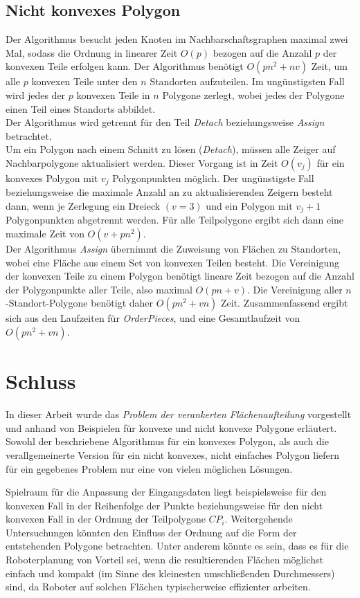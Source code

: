 \documentclass[ngerman]{seminarbeitrag}
\begin{document}
\subsection{Nicht konvexes Polygon}
Der Algorithmus \ord besucht jeden Knoten im Nachbarschaftsgraphen maximal zwei Mal, sodass die Ordnung in linearer Zeit $O(p)$ bezogen auf die Anzahl $p$ der konvexen Teile erfolgen kann.
Der Algorithmus \noncon benötigt $O(pn^{2} + nv)$ Zeit, um alle $p$ konvexen Teile unter den $n$ Standorten aufzuteilen. Im ungünstigsten Fall wird jedes der $p$ konvexen Teile in $n$ Polygone zerlegt, wobei jedes der Polygone einen Teil eines Standorts abbildet.\\
Der Algorithmus \daa wird getrennt für den Teil \emph{Detach} beziehungsweise \emph{Assign} betrachtet.\\
Um ein Polygon nach einem Schnitt zu lösen (\emph{Detach}), müssen alle Zeiger auf Nachbarpolygone aktualisiert werden. Dieser Vorgang ist in Zeit $O(v_{j})$ für ein konvexes Polygon mit $v_{j}$ Polygonpunkten möglich. Der ungünstigste Fall beziehungsweise die maximale Anzahl an zu aktualisierenden Zeigern besteht dann, wenn je Zerlegung ein Dreieck $(v=3)$ und ein Polygon mit $v_{j}+1$ Polygonpunkten abgetrennt werden. Für alle Teilpolygone ergibt sich dann eine maximale Zeit von $O(v + pn^{2})$.\\
Der Algorithmus \emph{Assign} übernimmt die Zuweisung von Flächen zu Standorten, wobei eine Fläche aus einem Set von konvexen Teilen besteht. Die Vereinigung der konvexen Teile zu einem Polygon benötigt lineare Zeit bezogen auf die Anzahl der Polygonpunkte aller Teile, also maximal $O(pn + v)$. Die Vereinigung aller $n$-Standort-Polygone benötigt daher $O(pn^{2}+ vn)$ Zeit. 
Zusammenfassend ergibt sich aus den Laufzeiten für \mbox{\textit{OrderPieces}}, \noncon und \daa eine Gesamtlaufzeit von $O(pn^{2} + vn)$.

\section{Schluss}\label{schluss}
In dieser Arbeit wurde das \emph{Problem der verankerten Flächenaufteilung} vorgestellt und anhand von Beispielen für konvexe und nicht konvexe Polygone erläutert.
Sowohl der beschriebene Algorithmus für ein konvexes Polygon, als auch die verallgemeinerte Version für ein nicht konvexes, nicht einfaches Polygon liefern für ein gegebenes Problem nur eine von vielen möglichen Lösungen.

Spielraum für die Anpassung der Eingangsdaten liegt beispielsweise für den konvexen Fall in der Reihenfolge der Punkte beziehungsweise für den nicht konvexen Fall in der Ordnung der Teilpolygone $CP_{i}$. Weitergehende Untersuchungen könnten den Einfluss der Ordnung auf die Form der entstehenden Polygone betrachten. Unter anderem könnte es sein, dass es für die Roboterplanung von Vorteil sei, wenn die resultierenden Flächen möglichst einfach und kompakt (im Sinne des kleinesten umschließenden Durchmessers) sind, da Roboter auf solchen Flächen typischerweise effizienter arbeiten.
\end{document}
